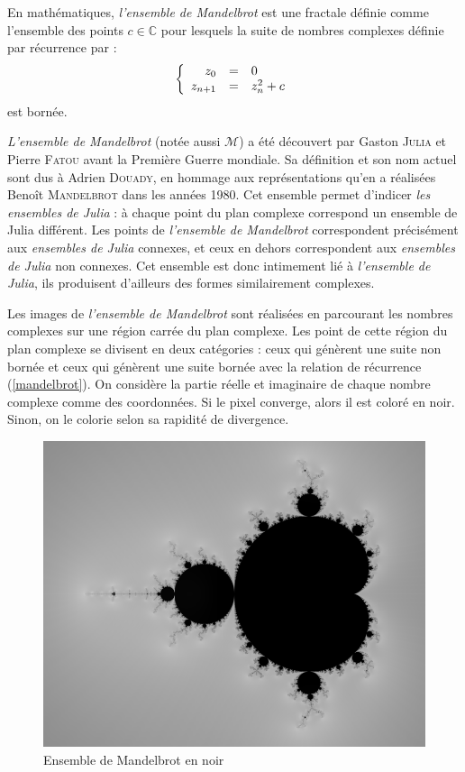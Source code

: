 \begin{itshape}
En mathématiques, \emph{l'ensemble de Mandelbrot} est une fractale définie comme l'ensemble des points $c \in \mathbb{C}$ pour lesquels la suite de nombres complexes définie par récurrence par :
\begin{equation}\label{mandelbrot}
\left\{
\begin{array}{r c l}
z_0 &=& 0\\
z_{n+1} &=& z^2_n+c
\end{array}
\right.
\end{equation}
est bornée.
\setlength{\parskip}{3 mm}

\emph{L'ensemble de Mandelbrot} (notée aussi $\mathcal{M}$) a été découvert par Gaston \textsc{Julia} et Pierre \textsc{Fatou} avant la Première Guerre mondiale. Sa définition et son nom actuel sont dus à Adrien \textsc{Douady}, en hommage aux représentations qu'en a réalisées Benoît \textsc{Mandelbrot} dans les années 1980. Cet ensemble permet d'indicer \emph{les ensembles de Julia} : à chaque point du plan complexe correspond un ensemble de Julia différent. Les points de \emph{l'ensemble de Mandelbrot} correspondent précisément aux \emph{ensembles de Julia} connexes, et ceux en dehors correspondent aux \emph{ensembles de Julia} non connexes. Cet ensemble est donc intimement lié à \emph{l'ensemble de Julia}, ils produisent d'ailleurs des formes similairement complexes.
\setlength{\parskip}{2 mm}

Les images de \emph{l'ensemble de Mandelbrot} sont réalisées en parcourant les nombres complexes sur une région carrée du plan complexe. Les point de cette région du plan complexe se divisent en deux catégories : ceux qui génèrent une suite non bornée et ceux qui génèrent une suite bornée avec la relation de récurrence (\ref{mandelbrot}). On considère la partie réelle et imaginaire de chaque nombre complexe comme des coordonnées. Si le pixel converge, alors il est coloré en noir. Sinon, on le colorie selon sa rapidité de divergence.
\end{itshape}

\begin{figure}\label{Ensemble de Mandelbrot en noir}
\centering
\includegraphics[scale=0.1]{images/Ensemble de Mandelbrot en noir.png}
\caption{Ensemble de Mandelbrot en noir}
\end{figure}
